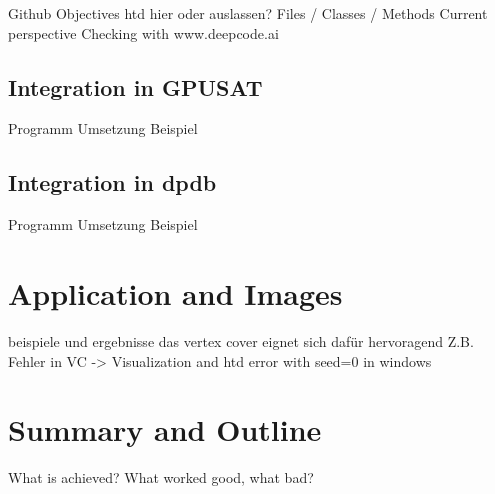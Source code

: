 \documentclass[a4paper, 12pt]{scrartcl}
\begin{document}
Github
Objectives
htd hier oder auslassen?
Files / Classes / Methods
Current 
perspective 
Checking with www.deepcode.ai

\newpage
\subsection{Integration in GPUSAT}
Programm
Umsetzung
Beispiel
\newpage
\subsection{Integration in dpdb}
Programm
Umsetzung
Beispiel
\newpage
\section{Application and Images }
beispiele und ergebnisse das vertex cover eignet sich dafür hervoragend
Z.B. Fehler in VC -> Visualization 
and htd error with seed=0 in windows
\newpage
\section{Summary and Outline}
What is achieved?
What worked good, what bad?
{}

\end{document}
